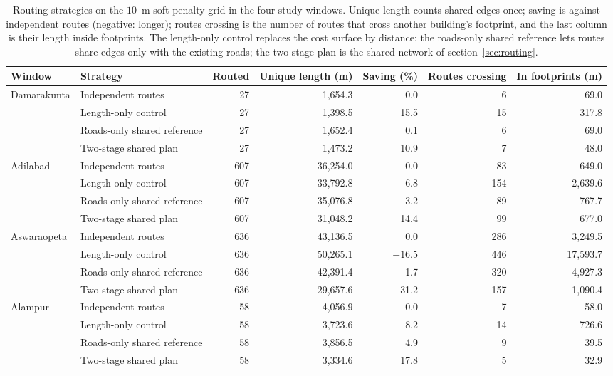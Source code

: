 \documentclass[preprint,12pt]{elsarticle}
\begin{document}
\begin{table}[htbp]
\caption{Routing strategies on the $10$~m soft-penalty grid in the four study windows. Unique length counts shared edges once; saving is against independent routes (negative: longer); routes crossing is the number of routes that cross another building's footprint, and the last column is their length inside footprints. The length-only control replaces the cost surface by distance; the roads-only shared reference lets routes share edges only with the existing roads; the two-stage plan is the shared network of section~\ref{sec:routing}.}
\label{tab:strategies}
\centering
\scriptsize
\begin{adjustbox}{max width=\textwidth}
\begin{tabular}{@{}llrrrrr@{}}
\toprule
Window & Strategy & Routed & Unique length (m) & Saving (\%) & Routes crossing & In footprints (m)\\
\midrule
Damarakunta & Independent routes & 27 & 1{,}654.3 & 0.0 & 6 & 69.0\\
& Length-only control & 27 & 1{,}398.5 & 15.5 & 15 & 317.8\\
& Roads-only shared reference & 27 & 1{,}652.4 & 0.1 & 6 & 69.0\\
& Two-stage shared plan & 27 & 1{,}473.2 & 10.9 & 7 & 48.0\\
\midrule
Adilabad & Independent routes & 607 & 36{,}254.0 & 0.0 & 83 & 649.0\\
& Length-only control & 607 & 33{,}792.8 & 6.8 & 154 & 2{,}639.6\\
& Roads-only shared reference & 607 & 35{,}076.8 & 3.2 & 89 & 767.7\\
& Two-stage shared plan & 607 & 31{,}048.2 & 14.4 & 99 & 677.0\\
\midrule
Aswaraopeta & Independent routes & 636 & 43{,}136.5 & 0.0 & 286 & 3{,}249.5\\
& Length-only control & 636 & 50{,}265.1 & $-16.5$ & 446 & 17{,}593.7\\
& Roads-only shared reference & 636 & 42{,}391.4 & 1.7 & 320 & 4{,}927.3\\
& Two-stage shared plan & 636 & 29{,}657.6 & 31.2 & 157 & 1{,}090.4\\
\midrule
Alampur & Independent routes & 58 & 4{,}056.9 & 0.0 & 7 & 58.0\\
& Length-only control & 58 & 3{,}723.6 & 8.2 & 14 & 726.6\\
& Roads-only shared reference & 58 & 3{,}856.5 & 4.9 & 9 & 39.5\\
& Two-stage shared plan & 58 & 3{,}334.6 & 17.8 & 5 & 32.9\\
\bottomrule
\end{tabular}
\end{adjustbox}
\end{table}
\end{document}
